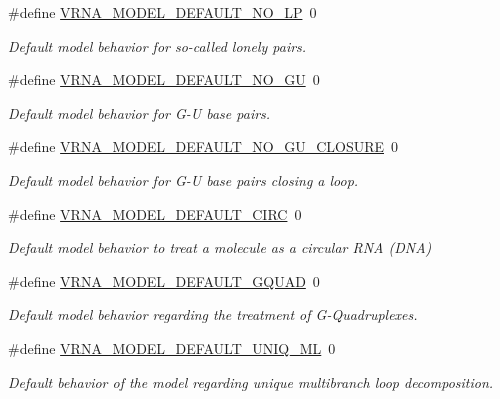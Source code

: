\begin{DoxyCompactItemize}
\#define \hyperlink{group__model__details_gab72462726dd60ed0d43339bbf7ee08ad}{V\+R\+N\+A\+\_\+\+M\+O\+D\+E\+L\+\_\+\+D\+E\+F\+A\+U\+L\+T\+\_\+\+N\+O\+\_\+\+LP}~0
\begin{DoxyCompactList}\small\item\em Default model behavior for so-\/called \textquotesingle{}lonely pairs\textquotesingle{}. \end{DoxyCompactList}\item 
\#define \hyperlink{group__model__details_ga34702f7d14d38b877ba8e475281e97e2}{V\+R\+N\+A\+\_\+\+M\+O\+D\+E\+L\+\_\+\+D\+E\+F\+A\+U\+L\+T\+\_\+\+N\+O\+\_\+\+GU}~0
\begin{DoxyCompactList}\small\item\em Default model behavior for G-\/U base pairs. \end{DoxyCompactList}\item 
\#define \hyperlink{group__model__details_ga5308de46faaca4b9fd16045864901ee7}{V\+R\+N\+A\+\_\+\+M\+O\+D\+E\+L\+\_\+\+D\+E\+F\+A\+U\+L\+T\+\_\+\+N\+O\+\_\+\+G\+U\+\_\+\+C\+L\+O\+S\+U\+RE}~0
\begin{DoxyCompactList}\small\item\em Default model behavior for G-\/U base pairs closing a loop. \end{DoxyCompactList}\item 
\#define \hyperlink{group__model__details_ga22059033db7bcd875c51fec32425490a}{V\+R\+N\+A\+\_\+\+M\+O\+D\+E\+L\+\_\+\+D\+E\+F\+A\+U\+L\+T\+\_\+\+C\+I\+RC}~0
\begin{DoxyCompactList}\small\item\em Default model behavior to treat a molecule as a circular R\+NA (D\+NA) \end{DoxyCompactList}\item 
\#define \hyperlink{group__model__details_ga793ed812e86f43799b14b2deee917f23}{V\+R\+N\+A\+\_\+\+M\+O\+D\+E\+L\+\_\+\+D\+E\+F\+A\+U\+L\+T\+\_\+\+G\+Q\+U\+AD}~0
\begin{DoxyCompactList}\small\item\em Default model behavior regarding the treatment of G-\/\+Quadruplexes. \end{DoxyCompactList}\item 
\#define \hyperlink{group__model__details_ga63f6006a02ba2d89148441f406c309e7}{V\+R\+N\+A\+\_\+\+M\+O\+D\+E\+L\+\_\+\+D\+E\+F\+A\+U\+L\+T\+\_\+\+U\+N\+I\+Q\+\_\+\+ML}~0
\begin{DoxyCompactList}\small\item\em Default behavior of the model regarding unique multibranch loop decomposition. \end{DoxyCompactList}\item 

\end{DoxyCompactItemize}
